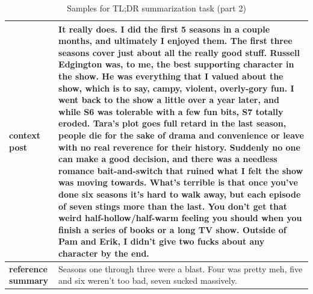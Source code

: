 \begin{table}[t]
\begin{center}
\caption*{Samples for TL;DR summarization task (part 2)}
\begin{tabular}{|p{2cm}|p{12cm}|}

\hline
    
\hline
\textbf{context post}
&
\multicolumn{1}{|C{12cm}|}{ 
It really does. I did the first 5 seasons in a couple months, and ultimately I enjoyed them. The first three seasons cover just about all the really good stuff. Russell Edgington was, to me, the best supporting character in the show. He was everything that I valued about the show, which is to say, campy, violent, overly-gory fun. I went back to the show a little over a year later, and while S6 was tolerable with a few fun bits, S7 totally eroded. Tara's plot goes full retard in the last season, people die for the sake of drama and convenience or leave with no real reverence for their history. Suddenly no one can make a good decision, and there was a needless romance bait-and-switch that ruined what I felt the show was moving towards.
\newline\newline
What's terrible is that once you've done six seasons it's hard to walk away, but each episode of seven stings more than the last. You don't get that weird half-hollow/half-warm feeling you should when you finish a series of books or a long TV show. Outside of Pam and Erik, I didn't give two fucks about any character by the end.
}
\\
\hline

\textbf{reference summary}
&
Seasons one through three were a blast. Four was pretty meh, five and six weren't too bad, seven sucked massively.
\\
\hline
\hline


\end{tabular}
\end{center}
\end{table}
